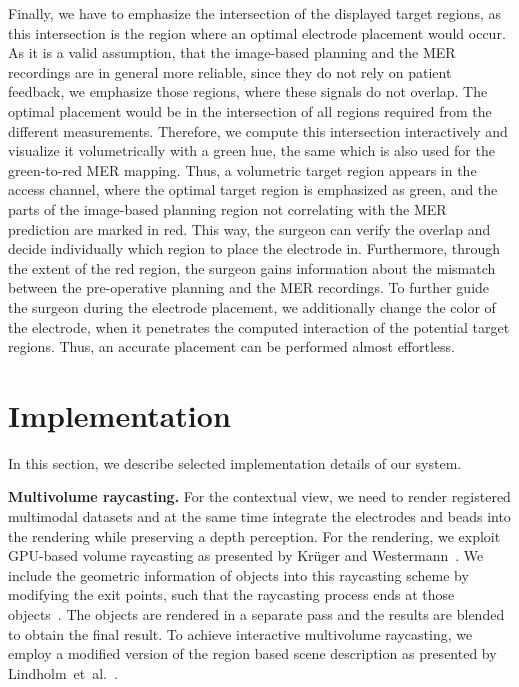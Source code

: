 \documentclass[journal]{vgtc}                %
\begin{document}
Finally, we have to emphasize the intersection of the displayed target regions, as this intersection is the region where an optimal electrode placement would occur. As it is a valid assumption, that the image-based planning and the MER recordings are in general more reliable, since they do not rely on patient feedback, we emphasize those regions, where these signals do not overlap. The optimal placement would be in the intersection of all regions required from the different measurements. Therefore, we compute this intersection interactively and visualize it volumetrically with a green hue, the same which is also used for the green-to-red MER mapping. Thus, a volumetric target region appears in the access channel, where the optimal target region is emphasized as green, and the parts of the image-based planning region not correlating with the MER prediction are marked in red. This way, the surgeon can verify the overlap and decide individually which region to place the electrode in. Furthermore, through the extent of the red region, the surgeon gains information about the mismatch between the pre-operative planning and the MER recordings. To further guide the surgeon during the electrode placement, we additionally change the color of the electrode, when it penetrates the computed interaction of the potential target regions. Thus, an accurate placement can be performed almost effortless.



\section{Implementation}\label{sec:implementation}
In this section, we describe selected implementation details of our system.

\noindent \textbf{Multivolume raycasting.} For the contextual view, we need to render registered multimodal datasets and at the same time integrate the electrodes and beads into the rendering while preserving a depth perception. For the rendering, we exploit GPU-based volume raycasting as presented by Kr\"uger and Westermann~\cite{kr}. We include the geometric information of objects into this raycasting scheme by modifying the exit points, such that the raycasting process ends at those objects~\cite{Scharsach}. The objects are rendered in a separate pass and the results are blended to obtain the final result. To achieve interactive multivolume raycasting, we employ a modified version of the region based scene description as presented by Lindholm~et~al.~\cite{Lindholm2009}.
\end{document}
